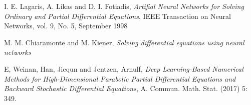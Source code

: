 \documentclass{article}
\begin{document}
%
%
\begin{thebibliography}{9}
I. E. Lagaris, A. Likas and D. I. Fotiadis,
\textit{Artifial Neural Networks for Solving Ordinary and Partial Differential Equations},
IEEE Transaction on Neural Networks, vol. 9, No. 5, September 1998

M. M. Chiaramonte and M. Kiener,
\textit{Solving differential equations using neural networks}

E, Weinan, Han, Jiequn and Jentzen, Arnulf,
\textit{Deep Learning-Based Numerical Methods for High-Dimensional Parabolic Partial Differential Equations and Backward Stochastic Differential Equations},
A. Commun. Math. Stat. (2017) 5: 349.
\end{thebibliography}
\end{document}
